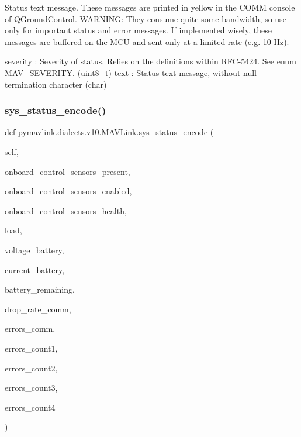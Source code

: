 \begin{DoxyVerb}
\begin{DoxyVerb}
\begin{DoxyVerb}
\begin{DoxyVerb}
\begin{DoxyVerb}
\begin{DoxyVerb}
\begin{DoxyVerb}
\begin{DoxyVerb}
\begin{DoxyVerb}
\begin{DoxyVerb}
\begin{DoxyVerb}Status text message. These messages are printed in yellow in the COMM
console of QGroundControl. WARNING: They consume quite
some bandwidth, so use only for important status and
error messages. If implemented wisely, these messages
are buffered on the MCU and sent only at a limited
rate (e.g. 10 Hz).

severity                  : Severity of status. Relies on the definitions within RFC-5424. See enum MAV_SEVERITY. (uint8_t)
text                      : Status text message, without null termination character (char)\end{DoxyVerb}
 \mbox{\label{classpymavlink_1_1dialects_1_1v10_1_1MAVLink_a1aecda2c67df087fe13c248b46ac4f6f}} 
\subsubsection{\texorpdfstring{sys\+\_\+status\+\_\+encode()}{sys\_status\_encode()}}
{\footnotesize\ttfamily def pymavlink.\+dialects.\+v10.\+M\+A\+V\+Link.\+sys\+\_\+status\+\_\+encode (\begin{DoxyParamCaption}\item[{}]{self,  }\item[{}]{onboard\+\_\+control\+\_\+sensors\+\_\+present,  }\item[{}]{onboard\+\_\+control\+\_\+sensors\+\_\+enabled,  }\item[{}]{onboard\+\_\+control\+\_\+sensors\+\_\+health,  }\item[{}]{load,  }\item[{}]{voltage\+\_\+battery,  }\item[{}]{current\+\_\+battery,  }\item[{}]{battery\+\_\+remaining,  }\item[{}]{drop\+\_\+rate\+\_\+comm,  }\item[{}]{errors\+\_\+comm,  }\item[{}]{errors\+\_\+count1,  }\item[{}]{errors\+\_\+count2,  }\item[{}]{errors\+\_\+count3,  }\item[{}]{errors\+\_\+count4 }\end{DoxyParamCaption})}


\end{DoxyVerb}
\end{DoxyVerb}
\end{DoxyVerb}
\end{DoxyVerb}
\end{DoxyVerb}
\end{DoxyVerb}
\end{DoxyVerb}
\end{DoxyVerb}
\end{DoxyVerb}
\end{DoxyVerb}
